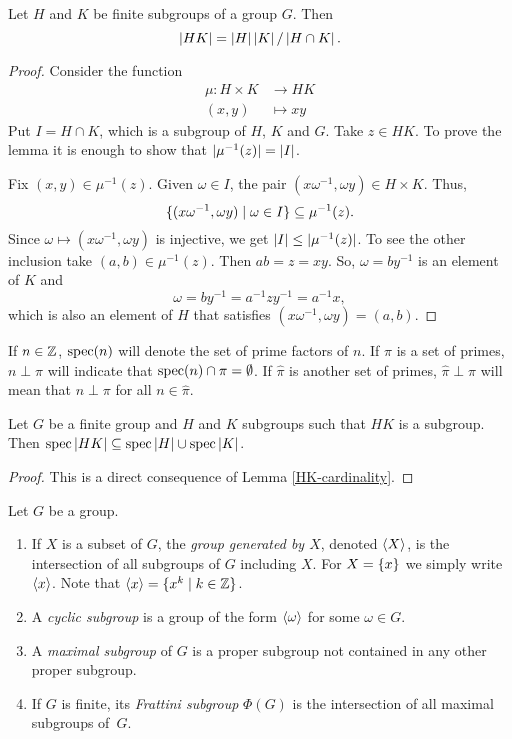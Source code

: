 \begin{lem}\label{HK-cardinality}
    Let $H$ and $K$ be finite subgroups of a group $G$. Then
    $$
        \left\vert{HK}\right\vert = \left\vert{H}\right\vert \left\vert{K}\right\vert / \left\vert{H\cap K}\right\vert.
    $$
\end{lem}
\begin{proof} Consider the function
\begin{align*}
    \mu\colon H\times K&\to HK\\
    (x,y)&\mapsto xy
\end{align*}
Put $I=H\cap K$, which is a subgroup of $H$, $K$ and $G$. Take $z\in HK$. To prove the lemma it is enough to show that $|\mu^{-1}(z)|=\left\vert{I}\right\vert$.

Fix $(x,y)\in\mu^{-1}(z)$. Given $\omega\in I$, the pair $(x\omega^{-1},\omega y)\in H\times K$. Thus,
$$
    \{(x\omega^{-1},\omega y)\mid\omega\in I\}\subseteq\mu^{-1}(z).
$$
Since $\omega\mapsto(x\omega^{-1},\omega y)$ is injective, we get $\left\vert{I}\right\vert\le|\mu^{-1}(z)|$. To see the other inclusion take $(a,b)\in\mu^{-1}(z)$. Then $ab=z=xy$. So, $\omega=by^{-1}$ is an element of $K$ and
$$
    \omega = by^{-1} = a^{-1}zy^{-1} = a^{-1}x,
$$
which is also an element of $H$ that satisfies $(x\omega^{-1},\omega y)=(a,b)$.

\end{proof}

\begin{ntns}
    If $n\in\mathbb{Z}$, $\operatorname{spec}(n)$ will denote the set of prime factors of $n$. If $\pi$ is a set of primes, $n\perp\pi$ will indicate that $\operatorname{spec}(n)\cap\pi=\emptyset$. If $\hat\pi$ is another set of primes, $\hat\pi\perp\pi$ will mean that $n\perp\pi$ for all $n\in\hat\pi$.
\end{ntns}

\begin{prop}\label{pi-product}
    Let $G$ be a finite group and $H$ and $K$ subgroups such that $HK$ is a subgroup. Then $\operatorname{spec}\left\vert{HK}\right\vert\subseteq\operatorname{spec}\left\vert{H}\right\vert\cup\operatorname{spec}\left\vert{K}\right\vert$.
\end{prop}

\begin{proof} This is a direct consequence of Lemma \ref{HK-cardinality}.  

\end{proof}

\begin{defns} Let $G$ be a group.
    \begin{enumerate}[\rm i)]
        \item If\/ $X$ is a subset of\/ $G$, the \textsl{group generated by $X$}, denoted $\langle X\rangle$, is the intersection of all subgroups of $G$ including $X$. For $X=\{x\}$ we simply write~$\langle x\rangle$. Note that $\langle x\rangle=\{x^k\mid k\in\mathbb{Z}\}$.
        \item A \textsl{cyclic subgroup} is a group of the form $\langle\omega\rangle$ for some $\omega\in G$.
        \item A \textsl{maximal subgroup} of\/ $G$ is a proper subgroup not contained in any other proper subgroup.
        \item If\/ $G$ is finite, its \textsl{Frattini subgroup} $\Phi(G)$ is the intersection of all maximal subgroups of~$G$.
    \end{enumerate}
\end{defns}

